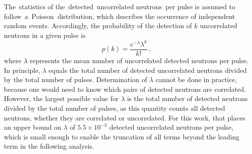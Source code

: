 The statistics of the detected uncorrelated neutrons per pulse is assumed to follow a Poisson distribution, which describes the occurrence of independent random events.
Accordingly, the probability of the detection of $k$ uncorrelated neutrons in a given pulse is
\begin{equation} \label{math:Pois}
p(k) = \frac{e^{-\lambda}\lambda^{k}}{k!} \, ,
\end{equation}
where $\lambda$ represents the mean number of uncorrelated detected neutrons per pulse.
In principle, $\lambda$ equals the total number of detected uncorrelated neutrons divided by the total number of pulses.
Determination of $\lambda$ cannot be done in practice, because one would need to know which pairs of detected neutrons are correlated.
However, the largest possible value for $\lambda$ is the total number of detected neutrons divided by the total number of pulses, as this quantity counts all detected neutrons, whether they are correlated or uncorrelated.
For this work, that places an upper bound on $\lambda$ of $5.5\times 10^{-3}$ detected uncorrelated neutrons per pulse, which is small enough to enable the truncation of all terms beyond the leading term in the following analysis.


